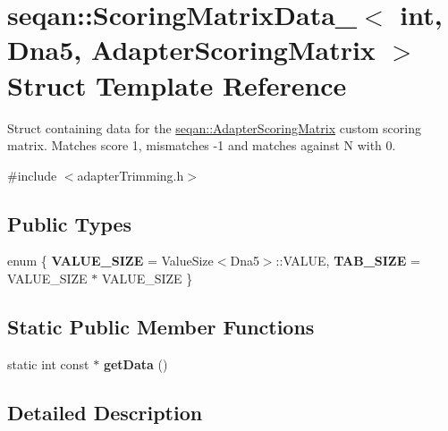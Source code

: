 \hypertarget{structseqan_1_1_scoring_matrix_data___3_01int_00_01_dna5_00_01_adapter_scoring_matrix_01_4}{\section{seqan\-:\-:Scoring\-Matrix\-Data\-\_\-$<$ int, Dna5, Adapter\-Scoring\-Matrix $>$ Struct Template Reference}
\label{structseqan_1_1_scoring_matrix_data___3_01int_00_01_dna5_00_01_adapter_scoring_matrix_01_4}
}


Struct containing data for the \hyperlink{structseqan_1_1_adapter_scoring_matrix}{seqan\-::\-Adapter\-Scoring\-Matrix} custom scoring matrix. Matches score 1, mismatches -\/1 and matches against N with 0.  




{\ttfamily \#include $<$adapter\-Trimming.\-h$>$}

\subsection*{Public Types}
\begin{DoxyCompactItemize}
\item 
enum \{ {\bfseries V\-A\-L\-U\-E\-\_\-\-S\-I\-Z\-E} = Value\-Size$<$Dna5$>$\-:\-:V\-A\-L\-U\-E, 
{\bfseries T\-A\-B\-\_\-\-S\-I\-Z\-E} = V\-A\-L\-U\-E\-\_\-\-S\-I\-Z\-E $\ast$ V\-A\-L\-U\-E\-\_\-\-S\-I\-Z\-E
 \}
\end{DoxyCompactItemize}
\subsection*{Static Public Member Functions}
\begin{DoxyCompactItemize}
\item 
\hypertarget{structseqan_1_1_scoring_matrix_data___3_01int_00_01_dna5_00_01_adapter_scoring_matrix_01_4_a77db480cd1d3f5e2c98b32af0c38716c}{static int const $\ast$ {\bfseries get\-Data} ()}\label{structseqan_1_1_scoring_matrix_data___3_01int_00_01_dna5_00_01_adapter_scoring_matrix_01_4_a77db480cd1d3f5e2c98b32af0c38716c}

\end{DoxyCompactItemize}


\subsection{Detailed Description}
